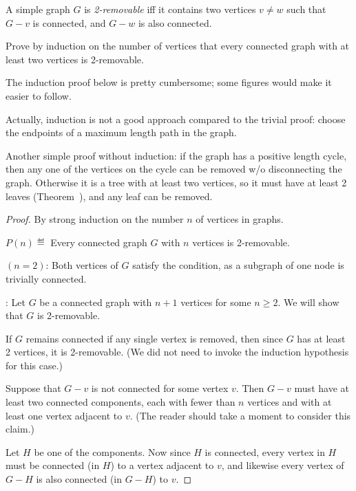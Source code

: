 
\begin{problem}
A simple graph $G$ is \emph{2-removable} iff it contains two vertices
$v \neq w$ such that $G-v$ is connected, and $G-w$ is also connected.

Prove by induction on the number of vertices that every connected
graph with at least two vertices is 2-removable.

\begin{staffnotes}
The induction proof below is pretty cumbersome; some figures would
make it easier to follow.

Actually, induction is not a good approach compared to the trivial
proof: choose the endpoints of a maximum length path in the graph.

Another simple proof without induction: if the graph has a positive
length cycle, then any one of the vertices on the cycle can be removed
w/o disconnecting the graph.  Otherwise it is a tree with at least two
vertices, so it must have at least 2 leaves
(Theorem~), and any leaf can be removed.
\end{staffnotes}

\begin{solution}

\begin{proof} By strong induction on the number $n$ of vertices in graphs.

 $P(n) \eqdef$ Every connected
graph $G$ with $n$ vertices is 2-removable.

 $(n=2)$: Both vertices of $G$ satisfy the
condition, as a subgraph of one node is trivially connected.

: Let $G$ be a connected graph with
$n+1$ vertices for some $n\geq 2$.  We will show that $G$ is
2-removable.

 If $G$ remains connected if any single vertex
is removed, then since $G$ has at least 2 vertices, it is 2-removable.
(We did not need to invoke the induction hypothesis for this case.)

 Suppose that $G-v$ is not connected for some
vertex $v$.  Then $G-v$ must have at least two connected components,
each with fewer than $n$ vertices and with at least one vertex
adjacent to $v$. (The reader should take a moment to consider this
claim.)

Let $H$ be one of the components.  Now since $H$ is connected, every
vertex in $H$ must be connected (in $H$) to a vertex adjacent to $v$,
and likewise every vertex of $G-H$ is also connected (in $G-H$) to
$v$.


\end{proof}
\end{solution}
\end{problem}
